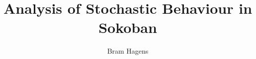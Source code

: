 \documentclass[acmtog, authorversion]{acmart}
\begin{document}
\renewcommand{\sectionautorefname}{Section}
\renewcommand{\subsectionautorefname}{Subsection}

\title[Analysis of Stochastic Behaviour in Sokoban]{Analysis of Stochastic Behaviour in Sokoban}


\author{Bram Hagens}



\renewcommand{\shortauthors}{Bram Hagens}

\begin{abstract}
    
\end{abstract}

\end{document}
